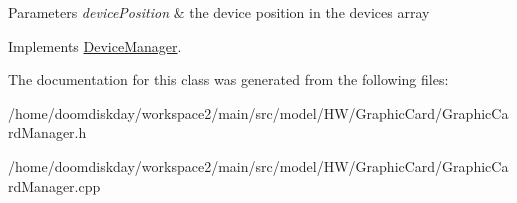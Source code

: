 \begin{DoxyParams}{Parameters}
{\em device\+Position} & the device position in the devices array \\
\hline
\end{DoxyParams}


Implements \hyperlink{classDeviceManager_ae367c6847b2988cf6249cbf6254261cb}{Device\+Manager}.



The documentation for this class was generated from the following files\+:\begin{DoxyCompactItemize}
\item 
/home/doomdiskday/workspace2/main/src/model/\+H\+W/\+Graphic\+Card/Graphic\+Card\+Manager.\+h\item 
/home/doomdiskday/workspace2/main/src/model/\+H\+W/\+Graphic\+Card/Graphic\+Card\+Manager.\+cpp\end{DoxyCompactItemize}
